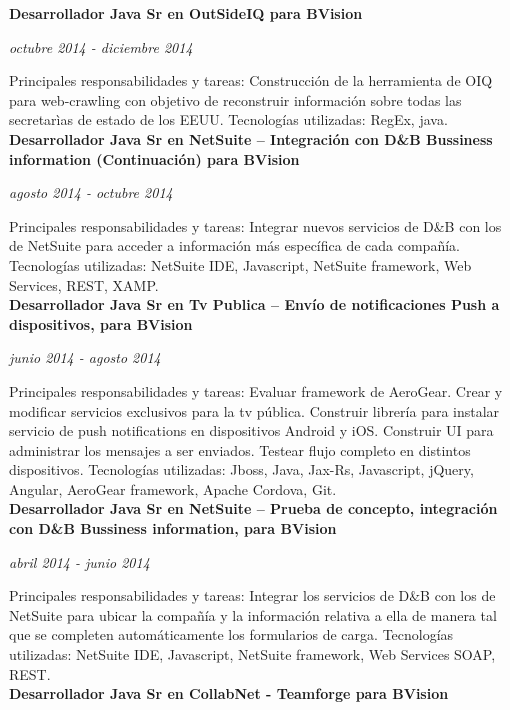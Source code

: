 \documentclass[a4paper,11pt]{article}
\begin{document}
\noindent \textbf{Desarrollador Java Sr en OutSideIQ para BVision}

\noindent \emph{octubre 2014 - diciembre 2014}

\noindent Principales responsabilidades y tareas: Construcción de la
herramienta de OIQ para web-crawling con objetivo de reconstruir información
sobre todas las secretarìas de estado de los EEUU.  Tecnologías utilizadas:
RegEx, java. \\

\noindent \textbf{Desarrollador Java Sr en NetSuite – Integración con D\&B
Bussiness information (Continuación) para BVision}

\noindent \emph{agosto 2014 - octubre 2014}

\noindent Principales responsabilidades y tareas: Integrar nuevos servicios de
D\&B con los de NetSuite para acceder a información más específica de cada
compañía.  Tecnologías utilizadas: NetSuite IDE, Javascript, NetSuite
framework, Web Services, REST, XAMP. \\

\noindent \textbf{Desarrollador Java Sr en Tv Publica – Envío de notificaciones
Push a dispositivos, para BVision}

\noindent \emph{junio 2014 - agosto 2014}

\noindent Principales responsabilidades y tareas: Evaluar framework de
AeroGear. Crear y modificar servicios exclusivos para la tv pública. Construir
librería para instalar servicio de push notifications en dispositivos Android y
iOS. Construir UI para administrar los mensajes a ser enviados. Testear flujo
completo en distintos dispositivos.  Tecnologías utilizadas: Jboss, Java,
Jax-Rs, Javascript, jQuery, Angular, AeroGear framework, Apache Cordova, Git.
\\

\noindent \textbf{Desarrollador Java Sr en NetSuite – Prueba de concepto,
integración con D\&B Bussiness information, para BVision}

\noindent \emph{abril 2014 - junio 2014}

\noindent Principales responsabilidades y tareas: Integrar los servicios de D\&B
con los de NetSuite para ubicar la compañía y la información relativa a ella de
manera tal que se completen automáticamente los formularios de carga.
Tecnologías utilizadas: NetSuite IDE, Javascript, NetSuite framework, Web
Services SOAP, REST. \\

\noindent \textbf{Desarrollador Java Sr en CollabNet - Teamforge para BVision}
\end{document}
